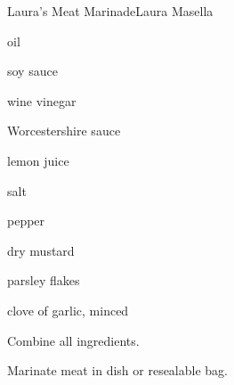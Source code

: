 \begin{recipe}{Laura's Meat Marinade}{Laura Masella}{}

\begin{ingredients}
\item \C{\quarter} oil
\item {} soy sauce
\item \Tp{1\half} wine vinegar
\item \Tp{\half} Worcestershire sauce
\item \tp{1\half} lemon juice
\item {} salt
\item \tp{\half} pepper
\item {} dry mustard
\item \tp{\quarter} parsley flakes
\item clove of garlic, minced
\end{ingredients}

\begin{directions}
\item Combine all ingredients.
\item Marinate meat in dish or resealable bag.
\end{directions}

\end{recipe}
